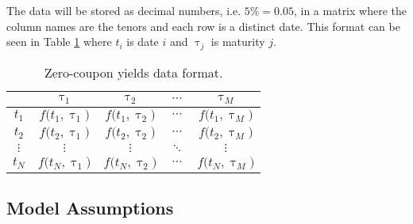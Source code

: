 \noindent The data will be stored as decimal numbers, i.e. $5\% = 0.05$, in a matrix where the column names are the tenors and each row is a distinct date. This format can be seen in Table \ref{table:rates matrix format} where $t_i$ is date $i$ and $\uptau_j$ is maturity $j$.


\begin{table}[!htbp]
\centering
\begin{tabular}{|c|c|c|c|c|}
\cline{2-5}
\multicolumn{1}{c|}{} & $\uptau_1$ & $\uptau_2$ & $\cdots$ & $\uptau_M$ \\ \hline
$t_1$ & $f \bigl( t_1 , \uptau_1 \bigr)$ & $f \bigl( t_1 , \uptau_2 \bigr)$ & $\cdots$ & $f \bigl( t_1 , \uptau_M \bigr)$ \\ \hline
$t_2$ & $f \bigl( t_2 , \uptau_1 \bigr)$ & $f \bigl( t_2 , \uptau_2 \bigr)$ & $\cdots$ & $f \bigl( t_2 , \uptau_M \bigr)$ \\ \hline
$\vdots$ & $\vdots$ & $\vdots$ & $\ddots$ & $\vdots$ \\ \hline
$t_N$ & $f \bigl( t_N , \uptau_1 \bigr)$ & $f \bigl( t_N , \uptau_2 \bigr)$ & $\cdots$ & $f \bigl( t_N , \uptau_M \bigr)$ \\ \hline
\end{tabular}
\caption[Zero-Coupon Yields Data Format.]{Zero-coupon yields data format.}
\label{table:rates matrix format}
\end{table}


\subsection{Model Assumptions}

